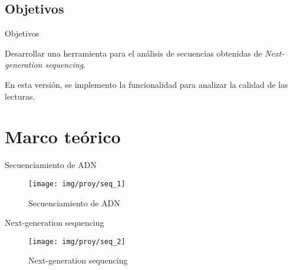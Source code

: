\documentclass[10pt]{beamer}
\newcommand{\1}{
        	\setbeamertemplate{background}{
        		\texttt{[image: img/1]}
        		\tikz[overlay] \fill[fill opacity=0.75,fill=white] (0,0) rectangle (-\paperwidth,\paperheight);
        	}
}
\begin{document}
\subsection{Objetivos}

\begin{frame}{Objetivos}{}
	\begin{block}{}
		Desarrollar una herramienta para el análisis de secuencias obtenidas de \textit{Next-generation sequencing}. 
	\end{block}

	\begin{block}{}
		En esta versión, se implemento la funcionalidad para analizar la calidad de las lecturas.
	\end{block}
\end{frame}




\section{Marco teórico}

\begin{frame}{Secuenciamiento de ADN}{}
	\begin{figure}[H]
	\centering
	\texttt{[image: img/proy/seq\_1]}
	\caption{Secuenciamiento de ADN}
\end{figure}
\end{frame}

\begin{frame}{Next-generation sequencing}{}
	\begin{figure}[H]
		\centering
		\texttt{[image: img/proy/seq\_2]}
		\caption{Next-generation sequencing}
	\end{figure}
\end{frame}
\end{document}
